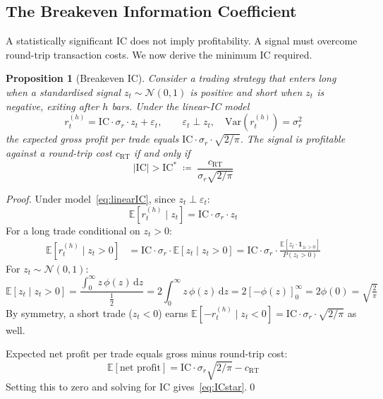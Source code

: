 \documentclass[12pt, a4paper]{article}
\theoremstyle{plain}
\newtheorem{proposition}{Proposition}[section]
\theoremstyle{definition}
\newcommand{\IC}{\mathrm{IC}}
\newcommand{\E}{\mathbb{E}}
\newcommand{\Var}{\mathrm{Var}}
\begin{document}
\subsection{The Breakeven Information Coefficient}
\label{sec:ICstar}

A statistically significant IC does not imply profitability. A signal must
overcome round-trip transaction costs. We now derive the minimum IC required.

\begin{proposition}[Breakeven IC]
  \label{prop:ICstar}
  Consider a trading strategy that enters long when a standardised signal
  $z_t \sim \mathcal{N}(0,1)$ is positive and short when $z_t$ is negative,
  exiting after $h$ bars.  Under the linear-IC model
  \begin{equation}
    r_t^{(h)} = \IC \cdot \sigma_r \cdot z_t + \varepsilon_t, \qquad
    \varepsilon_t \perp z_t,\quad
    \Var(r_t^{(h)}) = \sigma_r^2
    \label{eq:linearIC}
  \end{equation}
  the expected gross profit per trade equals
  $\IC \cdot \sigma_r \cdot \sqrt{2/\pi}$.  The signal is profitable
  against a round-trip cost $c_{\mathrm{RT}}$ if and only if
  \begin{equation}
    |\IC| > \IC^* \;\coloneqq\; \frac{c_{\mathrm{RT}}}{\sigma_r \sqrt{2/\pi}}
    \label{eq:ICstar}
  \end{equation}
\end{proposition}

\begin{proof}
  Under model~\eqref{eq:linearIC}, since $z_t \perp \varepsilon_t$:
  \[
    \E[r_t^{(h)} \mid z_t] = \IC \cdot \sigma_r \cdot z_t
  \]
  For a long trade conditional on $z_t > 0$:
  \begin{align*}
    \E[r_t^{(h)} \mid z_t > 0]
    &= \IC \cdot \sigma_r \cdot \E[z_t \mid z_t > 0]
    = \IC \cdot \sigma_r \cdot \frac{\E[z_t \cdot \mathbf{1}_{z_t > 0}]}
                                     {P(z_t > 0)}
  \end{align*}
  For $z_t \sim \mathcal{N}(0,1)$:
  \[
    \E[z_t \mid z_t > 0]
    = \frac{\int_0^\infty z\,\phi(z)\,\mathrm{d}z}{\tfrac{1}{2}}
    = 2\int_0^\infty z\,\phi(z)\,\mathrm{d}z
    = 2\left[-\phi(z)\right]_0^\infty
    = 2\phi(0)
    = \sqrt{\tfrac{2}{\pi}}
  \]
  By symmetry, a short trade ($z_t < 0$) earns $\E[-r_t^{(h)} \mid z_t < 0]
  = \IC \cdot \sigma_r \cdot \sqrt{2/\pi}$ as well.

  Expected net profit per trade equals gross minus round-trip cost:
  \[
    \E[\text{net profit}] = \IC \cdot \sigma_r \sqrt{2/\pi} - c_{\mathrm{RT}}
  \]
  Setting this to zero and solving for IC gives~\eqref{eq:ICstar}.\qed
\end{proof}
\end{document}
